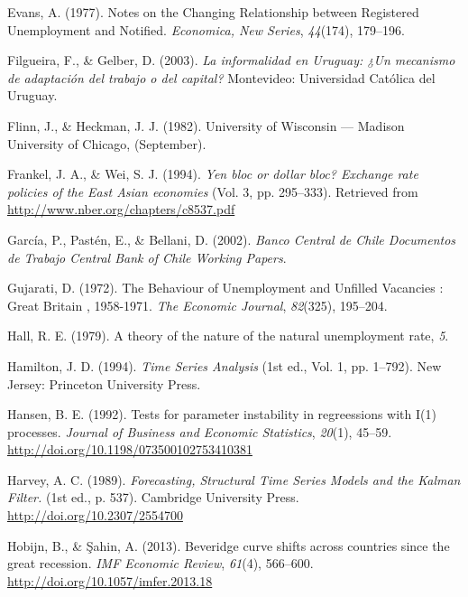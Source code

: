 \documentclass[12pt,oneside]{reedthesis}
\begin{document}
\leavevmode\hypertarget{ref-Evans1977}{}%
Evans, A. (1977). Notes on the Changing Relationship between Registered Unemployment and Notified. \emph{Economica, New Series}, \emph{44}(174), 179--196.

\leavevmode\hypertarget{ref-Filgueira2003}{}%
Filgueira, F., \& Gelber, D. (2003). \emph{La informalidad en Uruguay: ¿Un mecanismo de adaptación del trabajo o del capital?} Montevideo: Universidad Católica del Uruguay.

\leavevmode\hypertarget{ref-Flinn1982}{}%
Flinn, J., \& Heckman, J. J. (1982). University of Wisconsin --- Madison University of Chicago, (September).

\leavevmode\hypertarget{ref-Frankel1994}{}%
Frankel, J. A., \& Wei, S. J. (1994). \emph{Yen bloc or dollar bloc? Exchange rate policies of the East Asian economies} (Vol. 3, pp. 295--333). Retrieved from \url{http://www.nber.org/chapters/c8537.pdf}

\leavevmode\hypertarget{ref-BankChile2002}{}%
García, P., Pastén, E., \& Bellani, D. (2002). \emph{Banco Central de Chile Documentos de Trabajo Central Bank of Chile Working Papers}.

\leavevmode\hypertarget{ref-Gujarati1972}{}%
Gujarati, D. (1972). The Behaviour of Unemployment and Unfilled Vacancies : Great Britain , 1958-1971. \emph{The Economic Journal}, \emph{82}(325), 195--204.

\leavevmode\hypertarget{ref-Hall1979}{}%
Hall, R. E. (1979). A theory of the nature of the natural unemployment rate, \emph{5}.

\leavevmode\hypertarget{ref-Hamilton1994}{}%
Hamilton, J. D. (1994). \emph{Time Series Analysis} (1st ed., Vol. 1, pp. 1--792). New Jersey: Princeton University Press.

\leavevmode\hypertarget{ref-Hansen1992}{}%
Hansen, B. E. (1992). Tests for parameter instability in regreessions with I(1) processes. \emph{Journal of Business and Economic Statistics}, \emph{20}(1), 45--59. \url{http://doi.org/10.1198/073500102753410381}

\leavevmode\hypertarget{ref-Harvey1989}{}%
Harvey, A. C. (1989). \emph{Forecasting, Structural Time Series Models and the Kalman Filter.} (1st ed., p. 537). Cambridge University Press. \url{http://doi.org/10.2307/2554700}

\leavevmode\hypertarget{ref-Hobijn2013}{}%
Hobijn, B., \& Şahin, A. (2013). Beveridge curve shifts across countries since the great recession. \emph{IMF Economic Review}, \emph{61}(4), 566--600. \url{http://doi.org/10.1057/imfer.2013.18}
\end{document}

